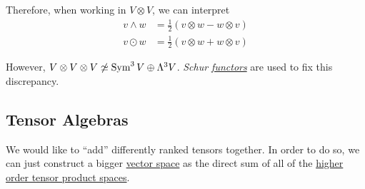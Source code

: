   Therefore, when working in $V \otimes V$, we can interpret 
  \begin{align}
		v \wedge w & = \frac{1}{2} (v \otimes w - w \otimes v) \\
		v \odot w & = \frac{1}{2} (v \otimes w + w \otimes v) 
  \end{align}

  However, $V \otimes V \otimes V \not\simeq \operatorname{Sym}^3 V \oplus \Lambda^3 V$. \textit{Schur \hyperref[cat-def:functor]{functors}} are used to fix this discrepancy. 

\subsection{Tensor Algebras}

	We would like to ``add'' differently ranked tensors together. In order to do so, we can just construct a bigger \hyperref[def:vector-space]{vector space} as the direct sum of all of the \hyperref[def:higher-order-tensor-product-spaces]{higher order tensor product spaces}. 

